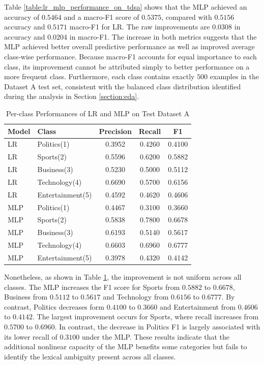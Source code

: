 \documentclass[letterpaper,conference,compsoc,onecolumn]{IEEEtran}
\begin{document}
Table \ref{table:lr_mlp_performance_on_tdsa} shows that the MLP achieved an accuracy of $0.5464$ and a macro-F1 score of $0.5375$, compared with $0.5156$ accuracy and $0.5171$ macro-F1 for LR. The raw improvements are $0.0308$ in accuracy and $0.0204$ in macro-F1.
The increase in both metrics suggests that the MLP achieved better overall predictive performance as well as improved average class-wise performance.
Because macro-F1 accounts for equal importance to each class, its improvement cannot be attributed simply to better performance on a more frequent class. Furthermore, each class contains exactly $500$ examples in the Dataset A test set, consistent with the balanced class distribution identified during the analysis in Section \ref{section:eda}.

\begin{table}[h]
  \centering
  \caption{Per-class Performances of LR and MLP on Test Dataset A}
  \label{table:lr_mlp_per_class_performance_on_tdsa}
  \begin{tabular}{llccc}
    \hline
    \textbf{Model} & \textbf{Class} & \textbf{Precision} & \textbf{Recall} & \textbf{F1}\\
    \hline
    LR & Politics(1) & 0.3952 & 0.4260 & 0.4100\\
    LR & Sports(2) & 0.5596 & 0.6200 & 0.5882\\
    LR & Business(3) & 0.5230 & 0.5000 & 0.5112\\
    LR & Technology(4) & 0.6690 & 0.5700 & 0.6156\\
    LR & Entertainment(5) & 0.4592 & 0.4620 & 0.4606\\
    MLP & Politics(1) & 0.4467 & 0.3100 & 0.3660\\
    MLP & Sports(2) & 0.5838 & 0.7800 & 0.6678\\
    MLP & Business(3) & 0.6193 & 0.5140 & 0.5617\\
    MLP & Technology(4) & 0.6603 & 0.6960 & 0.6777\\
    MLP & Entertainment(5) & 0.3978 & 0.4320 & 0.4142\\
    \hline  
  \end{tabular}
\end{table}

Nonetheless, as shown in Table \ref{table:lr_mlp_per_class_performance_on_tdsa}, the improvement is not uniform across all classes. The MLP increases the F1 score for Sports from $0.5882$ to $0.6678$, Business from $0.5112$ to $0.5617$ and Technology from $0.6156$ to $0.6777$. By contrast, Politics decreases form $0.4100$ to $0.3660$ and Entertainment from $0.4606$ to $0.4142$.
The largest improvement occurs for Sports, where recall increases from $0.5700$ to $0.6960$. In contrast, the decrease in Politics F1 is largely associated with its lower recall of $0.3100$ under the MLP. These results indicate that the additional nonlinear capacity of the MLP benefits some categories but fails to identify the lexical ambiguity present across all classes.
\end{document}
